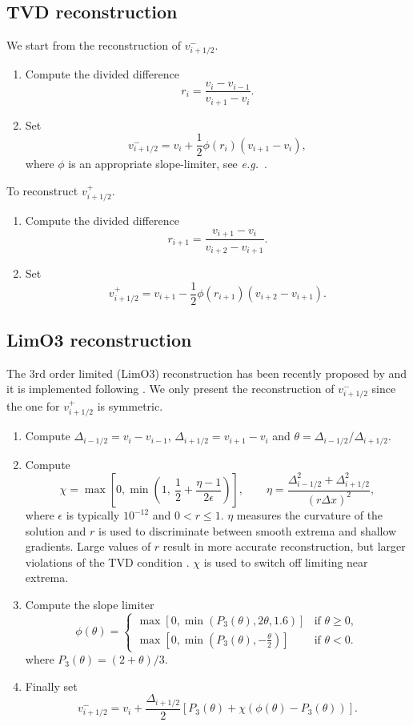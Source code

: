 \subsection{TVD reconstruction}
We start from the reconstruction of $v_{i+1/2}^-$.
\begin{enumerate}
  \item Compute the divided difference
  \[
    r_i = \frac{v_{i} - v_{i-1}}{v_{i+1} - v_i}.
  \]
  \item Set
  \[
    v_{i+1/2}^- = v_i + \frac{1}{2} \phi(r_i) (v_{i+1} - v_i),
  \]
  where $\phi$ is an appropriate slope-limiter, see
  \textit{e.g.}~\cite{leveque}.
\end{enumerate}
To reconstruct $v_{i+1/2}^+$.
\begin{enumerate}
  \item Compute the divided difference
  \[
    r_{i+1} = \frac{v_{i+1} - v_i}{v_{i+2} - v_{i+1}}.
  \]
  \item Set
  \[
    v_{i+1/2}^+ = v_{i+1} - \frac{1}{2} \phi(r_{i+1}) (v_{i+2} - v_{i+1}).
  \]
\end{enumerate}

\subsection{LimO3 reconstruction}
The 3rd order limited (LimO3) reconstruction has been recently proposed
by \cite{cada} and it is implemented following \cite{mignone}. We only
present the reconstruction of $v_{i+1/2}^-$ since the one for
$v_{i+1/2}^+$ is symmetric.
\begin{enumerate}
  \item Compute $\Delta_{i-1/2} = v_{i} - v_{i-1}$, $\Delta_{i+1/2} =
  v_{i+1} - v_i$ and $\theta = \Delta_{i-1/2}/\Delta_{i+1/2}$.
  \item Compute
  \[
    \chi = \max\left[0,\min\left(1,\ \frac{1}{2} + \frac{\eta -
    1}{2\epsilon}\right)\right], \qquad
    \eta = \frac{\Delta^2_{i-1/2} + \Delta^2_{i+1/2}}{(r\Delta x)^2},
  \]
  where $\epsilon$ is typically $10^{-12}$ and $0 < r \leq 1$. $\eta$
  measures the curvature of the solution and $r$ is used to discriminate
  between smooth extrema and shallow gradients. Large values of $r$
  result in more accurate reconstruction, but larger violations of the
  TVD condition \cite{cada}. $\chi$ is used to switch off limiting near
  extrema.
  \item Compute the slope limiter
  \[
    \phi(\theta) = \left\{\begin{array}{ll}
      \max[0, \min(P_3(\theta), 2\theta, 1.6)] & \textrm{if } \theta
        \geq 0, \\
      \max\left[0, \min\left(P_3(\theta), -\frac{\theta}{2}\right)\right]
        & \textrm{if } \theta < 0.
    \end{array}\right.
  \]
  where $P_3(\theta) = (2 + \theta)/3$.
  \item Finally set
  \[
    v_{i+1/2}^- = v_i + \frac{\Delta_{i+1/2}}{2}\left[P_3(\theta) +
      \chi\left(\phi(\theta) - P_3(\theta)\right)\right].
  \]
\end{enumerate}

